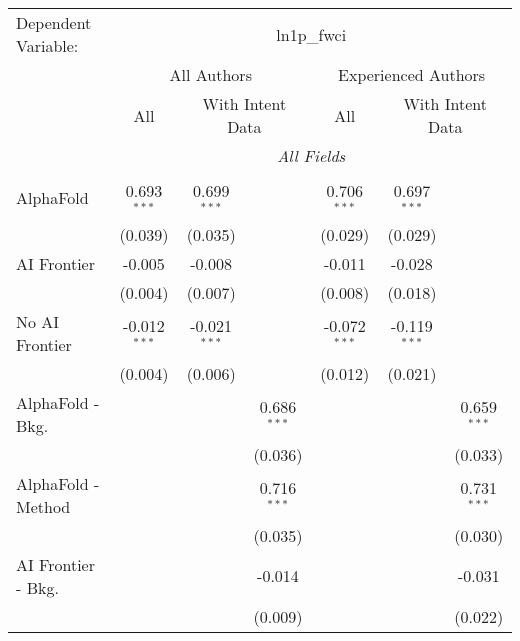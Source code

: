 \begingroup
\centering
\begin{tabular}{lcccccc}
   \tabularnewline \midrule \midrule
   Dependent Variable: & \multicolumn{6}{c}{ln1p\_fwci}\\
 & \multicolumn{3}{c}{All Authors} & \multicolumn{3}{c}{Experienced Authors} \\
\cmidrule(lr){2-4} \cmidrule(lr){5-7}
 & \multicolumn{1}{c}{All} & \multicolumn{2}{c}{With Intent Data} & \multicolumn{1}{c}{All} & \multicolumn{2}{c}{With Intent Data} \\
\cmidrule(lr){2-2} \cmidrule(lr){3-4} \cmidrule(lr){5-5} \cmidrule(lr){6-7}
 & \multicolumn{6}{c}{\textit{All Fields}} \\ \\
   AlphaFold               & 0.693$^{***}$  & 0.699$^{***}$  &                & 0.706$^{***}$  & 0.697$^{***}$  &   \\   
                           & (0.039)        & (0.035)        &                & (0.029)        & (0.029)        &   \\   
   AI Frontier             & -0.005         & -0.008         &                & -0.011         & -0.028         &   \\   
                           & (0.004)        & (0.007)        &                & (0.008)        & (0.018)        &   \\   
   No AI Frontier          & -0.012$^{***}$ & -0.021$^{***}$ &                & -0.072$^{***}$ & -0.119$^{***}$ &   \\   
                           & (0.004)        & (0.006)        &                & (0.012)        & (0.021)        &   \\   
   AlphaFold - Bkg.        &                &                & 0.686$^{***}$  &                &                & 0.659$^{***}$\\   
                           &                &                & (0.036)        &                &                & (0.033)\\   
   AlphaFold - Method      &                &                & 0.716$^{***}$  &                &                & 0.731$^{***}$\\   
                           &                &                & (0.035)        &                &                & (0.030)\\   
   AI Frontier - Bkg.      &                &                & -0.014         &                &                & -0.031\\   
                           &                &                & (0.009)        &                &                & (0.022)\\   

\end{tabular}
